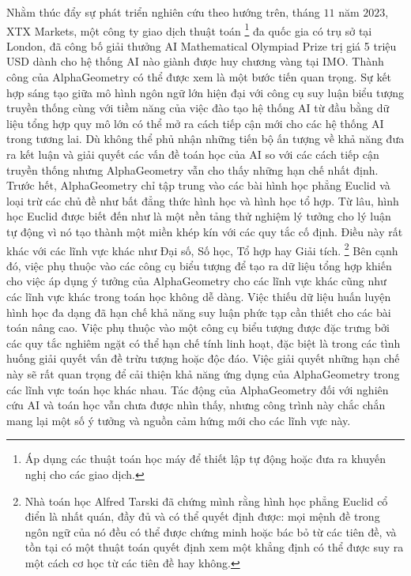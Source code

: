 \begin{multicols}{2}
	\vskip 0.1cm
	Nhằm thúc đẩy sự phát triển nghiên cứu theo hướng trên, tháng $11$ năm $2023$, XTX Markets, một công ty giao dịch thuật toán \footnote[4]{\color{timhieukhoahoc}Áp dụng các thuật toán học máy để thiết lập tự động hoặc đưa ra khuyến nghị cho các giao dịch.} đa quốc gia có trụ sở tại London, đã công bố giải thưởng AI Mathematical Olympiad Prize trị giá 5 triệu USD dành cho hệ thống AI nào giành được huy chương vàng tại IMO. Thành công của AlphaGeometry có thể được xem là một bước tiến quan trọng. Sự kết hợp sáng tạo giữa mô hình ngôn ngữ lớn hiện đại với công cụ suy luận biểu tượng truyền thống cùng với tiềm năng của việc đào tạo hệ thống AI từ đầu bằng dữ liệu tổng hợp quy mô lớn có thể mở ra cách tiếp cận mới cho các hệ thống AI trong tương lai. 
	\vskip 0.1cm
	Dù không thể phủ nhận những tiến bộ ấn tượng về khả năng đưa ra kết luận và giải quyết các vấn đề toán học của AI so với các cách tiếp cận truyền thống nhưng AlphaGeometry vẫn cho thấy những hạn chế nhất định. 
	\vskip 0.1cm
	Trước hết, AlphaGeometry chỉ tập trung vào các bài hình học phẳng Euclid và loại trừ các chủ đề như bất đẳng thức hình học và hình học tổ hợp. Từ lâu, hình học Euclid được biết đến như là một nền tảng thử nghiệm lý tưởng cho lý luận tự động vì nó tạo thành một miền khép kín với các quy tắc cố định. Điều này rất khác với các lĩnh vực khác như Đại số, Số học, Tổ hợp hay Giải tích. \footnote[5]{\color{timhieukhoahoc}Nhà toán học Alfred Tarski đã chứng mình rằng hình học phẳng Euclid cổ điển là nhất quán, đầy đủ và có thể quyết định được: mọi mệnh đề trong ngôn ngữ của nó đều có thể được chứng minh hoặc bác bỏ từ các tiên đề, và tồn tại có một thuật toán quyết định xem một khẳng định có thể được suy ra một cách cơ học từ các tiên đề hay không.}
	\vskip 0.1cm
	Bên cạnh đó, việc phụ thuộc vào các công cụ biểu tượng để tạo ra dữ liệu tổng hợp khiến cho việc áp dụng ý tưởng của AlphaGeometry cho các lĩnh vực khác cũng như các lĩnh vực khác trong toán học không dễ dàng. Việc thiếu dữ liệu huấn luyện hình học đa dạng đã hạn chế khả năng suy luận phức tạp cần thiết cho các bài toán nâng cao. Việc phụ thuộc vào một công cụ biểu tượng được đặc trưng bởi các quy tắc nghiêm ngặt có thể hạn chế tính linh hoạt, đặc biệt là trong các tình huống giải quyết vấn đề trừu tượng hoặc độc đáo. Việc giải quyết những hạn chế này sẽ rất quan trọng để cải thiện khả năng ứng dụng của AlphaGeometry trong các lĩnh vực toán học khác nhau.
	\vskip 0.1cm
	Tác động của AlphaGeometry đối với nghiên cứu AI và toán học vẫn chưa được nhìn thấy, nhưng công trình này chắc chắn mang lại một số ý tưởng và nguồn cảm hứng mới cho các lĩnh vực này. 

\end{multicols}

